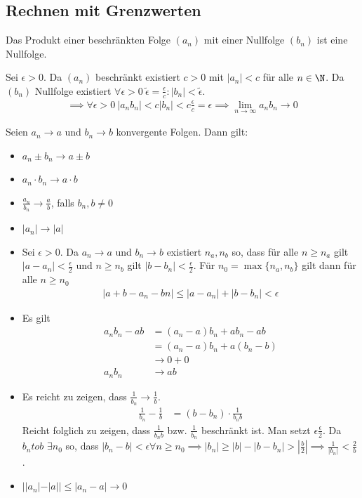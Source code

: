 \subsection{Rechnen mit Grenzwerten}
\begin{lemma}
	Das Produkt einer beschränkten Folge $(a_n)$ mit einer Nullfolge $(b_n)$ ist eine Nullfolge.
\end{lemma}
\prove Sei $\epsilon >0$. Da $(a_n)$ beschränkt existiert $c>0$ mit $|a_n|<c$ für alle $n\in \N$. Da $(b_n)$ Nullfolge existiert $\forall \epsilon > 0\ \tilde{\epsilon}=\frac{\epsilon}{c}: |b_n|<\tilde{\epsilon}$.
\begin{align*}
	\implies \forall \epsilon > 0\ |a_nb_n|<c|b_n|<c\frac{\epsilon}{c}=\epsilon\implies \lim\limits_{n\to\infty}a_n b_n \to 0
\end{align*}
\begin{theorem}
	Seien $a_n \to a$ und $b_n \to b$ konvergente Folgen. Dann gilt:
	\begin{itemize}
		\item $a_n\pm b_n \to a\pm b$
		\item $a_n\cdot b_n\to a\cdot b$
		\item $\frac{a_n}{b_n}\to \frac{a}{b}$, falls $b_n, b \neq 0$
		\item $|a_n|\to |a|$
	\end{itemize}
\end{theorem}
\prove
\begin{itemize}
	\item Sei $\epsilon >0$. Da $a_n \to a$ und $b_n \to b$ existiert $n_a, n_b$ so, dass für alle $n\geq n_a$ gilt $|a-a_n|<\frac{\epsilon}{2}$ und $n\geq n_b$ gilt $|b-b_n|<\frac{\epsilon}{2}$. Für $n_0=\max\{n_a,n_b\}$ gilt dann für alle $n\geq n_0$
	\begin{align*}
		|a+b-a_n-bn|\leq |a-a_n|+|b-b_n| < \epsilon
	\end{align*}
	\item Es gilt
	\begin{align*}
		a_nb_n-ab&=(a_n-a)b_n+ab_n-ab\\
		&= (a_n-a)b_n +a(b_n-b)\\
		&\to 0 + 0\\
		a_nb_n &\to ab
	\end{align*}
	\item Es reicht zu zeigen, dass $\frac{1}{b_n}\to\frac{1}{b}$.
	\begin{align*}
		\frac{1}{b_n}-\frac{1}{b}&=(b-b_n)\cdot \frac{1}{b_nb}
	\end{align*}
	Reicht folglich zu zeigen, dass $\frac{1}{b_nb}$ bzw. $\frac{1}{b_n}$ beschränkt ist.
	Man setzt $\epsilon \frac{\epsilon}{2}$. Da $b_n to b$ $\exists n_0$ so, dass $|b_n-b|< \epsilon \forall n \geq n_0\implies |b_n| \geq |b|-|b-b_n|>|\frac{b}{2}| \implies \frac{1}{|b_n|}<\frac{2}{b}$.
	\item $||a_n|-|a||\leq |a_n-a|\to 0$
\end{itemize}
